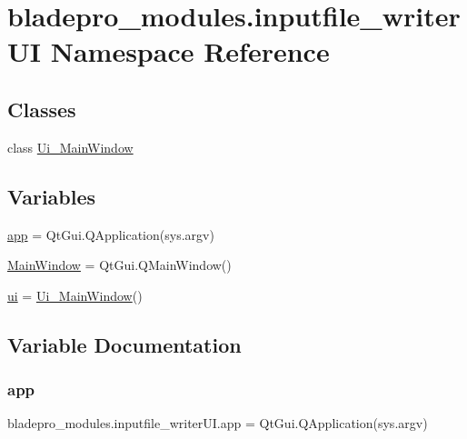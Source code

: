 \hypertarget{a00049}{}\section{bladepro\+\_\+modules.\+inputfile\+\_\+writer\+UI Namespace Reference}
\label{a00049}
\subsection*{Classes}
\begin{DoxyCompactItemize}
\item 
class \hyperlink{a00074}{Ui\+\_\+\+Main\+Window}
\end{DoxyCompactItemize}
\subsection*{Variables}
\begin{DoxyCompactItemize}
\item 
\hyperlink{a00049_abb2f696d468ab34ad27b9d0c256b8e72}{app} = Qt\+Gui.\+Q\+Application(sys.\+argv)
\item 
\hyperlink{a00049_ab649489a40967421c06970ba9ffeef53}{Main\+Window} = Qt\+Gui.\+Q\+Main\+Window()
\item 
\hyperlink{a00049_ad10cb13360f604c82c202259b73f747b}{ui} = \hyperlink{a00074}{Ui\+\_\+\+Main\+Window}()
\end{DoxyCompactItemize}


\subsection{Variable Documentation}
\hypertarget{a00049_abb2f696d468ab34ad27b9d0c256b8e72}{}\label{a00049_abb2f696d468ab34ad27b9d0c256b8e72} 
\subsubsection{\texorpdfstring{app}{app}}
{\footnotesize\ttfamily bladepro\+\_\+modules.\+inputfile\+\_\+writer\+U\+I.\+app = Qt\+Gui.\+Q\+Application(sys.\+argv)}

\hypertarget{a00049_ab649489a40967421c06970ba9ffeef53}{}\label{a00049_ab649489a40967421c06970ba9ffeef53} 
